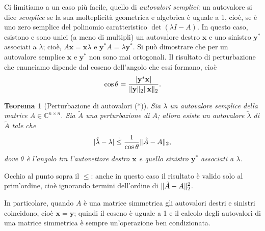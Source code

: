 \documentclass[a4paper]{report}
\DeclarePairedDelimiter{\abs}{\lvert}{\rvert}
\DeclarePairedDelimiter{\norm}{\lVert}{\rVert}
\newtheorem{theorem}{Teorema}[chapter]
\theoremstyle{definiton}
\theoremstyle{remark}
\begin{document}
Ci limitiamo a un caso più facile, quello di \emph{autovalori semplici}: un autovalore si dice \emph{semplice} se la sua molteplicità geometrica e algebrica è uguale a 1, cioè, se è uno zero semplice del polinomio caratteristico $\det(\lambda I - A)$. In questo caso, esistono e sono unici (a meno di multipli) un autovalore destro $\mathbf{x}$ e uno sinistro $\mathbf{y}^*$ associati a $\lambda$; cioè, $A\mathbf{x} = \mathbf{x}\lambda$ e $\mathbf{y}^* A = \lambda \mathbf{y}^*$. Si può dimostrare che per un autovalore semplice $\mathbf{x}$ e $\mathbf{y}^*$ non sono mai ortogonali. Il risultato di perturbazione che enunciamo dipende dal coseno dell'angolo che essi formano, cioè
\[
\cos \theta = \frac{\abs{\mathbf{y}^* \mathbf{x}}}{\norm{\mathbf{y}}_2 \norm{\mathbf{x}}_2}.
\]
\begin{theorem}[Perturbazione di autovalori (*)]
Sia $\lambda$ un autovalore \emph{semplice} della matrice $A \in \mathbb{C}^{n\times n}$. Sia $\tilde{A}$ una perturbazione di $A$; allora esiste un autovalore $\tilde{\lambda}$ di $\tilde{A}$ tale che
\[
\abs{\tilde{\lambda} - \lambda} \stackrel{.}{\leq} \frac{1}{\cos \theta}\norm{\tilde{A}-A}_2,
\]
dove $\theta$ è l'angolo tra l'autovettore destro $\mathbf{x}$ e quello sinistro $\mathbf{y}^*$ associati a $\lambda$.
\end{theorem}
Occhio al punto sopra il $\leq$: anche in questo caso il risultato è valido solo al prim'ordine, cioè ignorando termini dell'ordine di $\norm{\tilde{A}-A}_2^2$.

In particolare, quando $A$ è una matrice simmetrica gli autovalori destri e sinistri coincidono, cioè $\mathbf{x}=\mathbf{y}$; quindi il coseno è uguale a 1 e il calcolo degli autovalori di una matrice simmetrica è sempre un'operazione ben condizionata.
\end{document}
